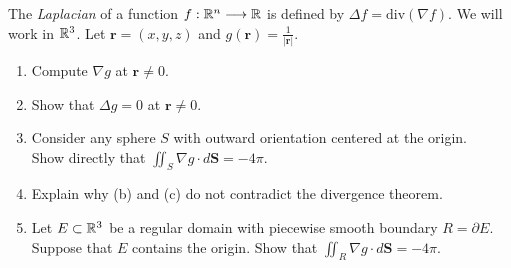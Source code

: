 \documentclass[../hw10]{subfiles}
\begin{document}
\begin{problem}[1]
The \textit{Laplacian} of a function $f:\mathbb{R}^{n}\longrightarrow \mathbb{R}$ is defined by $\Delta f = \text{div} (\nabla f)$.
We will work in $\mathbb{R}^3$. Let $\mathbf{r} = (x,y,z)$ and $g(\mathbf{r})=\frac{1}{|\mathbf{r}|}$.
\begin{enumerate}[label=(\alph*)]
	\item Compute $\nabla g$ at $\mathbf{r}\neq 0$.
	\item Show that $\Delta g = 0$ at  $\mathbf{r}\neq 0$.
	\item Consider any sphere $S$ with outward orientation centered at the origin. \\
	      Show directly that $\iint_S \nabla g \cdot d\mathbf{S} = -4\pi$.
	\item Explain why (b) and (c) do not contradict the divergence theorem.
	\item Let $E\subset \mathbb{R}^3$ be a regular domain with piecewise smooth boundary $R = \partial{E}$.
	      Suppose that $E$ contains the origin.
	      Show that $\iint_R \nabla g \cdot d\mathbf{S} = -4\pi$.
\end{enumerate}
\end{problem}
\end{document}
